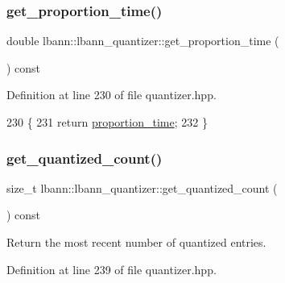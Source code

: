 \subsubsection{\texorpdfstring{get\+\_\+proportion\+\_\+time()}{get\_proportion\_time()}}
{\footnotesize\ttfamily double lbann\+::lbann\+\_\+quantizer\+::get\+\_\+proportion\+\_\+time (\begin{DoxyParamCaption}{ }\end{DoxyParamCaption}) const\hspace{0.3cm}{\ttfamily [inline]}}



Definition at line 230 of file quantizer.\+hpp.


\begin{DoxyCode}
230                                      \{
231     \textcolor{keywordflow}{return} \hyperlink{classlbann_1_1lbann__quantizer_a6bd266728f578df0c86fc2e493742cc1}{proportion\_time};
232   \}
\end{DoxyCode}
\mbox{\label{classlbann_1_1lbann__quantizer_afe560823e51a64b1bb42c6f6cbd83ee0}} 
\subsubsection{\texorpdfstring{get\+\_\+quantized\+\_\+count()}{get\_quantized\_count()}}
{\footnotesize\ttfamily size\+\_\+t lbann\+::lbann\+\_\+quantizer\+::get\+\_\+quantized\+\_\+count (\begin{DoxyParamCaption}{ }\end{DoxyParamCaption}) const\hspace{0.3cm}{\ttfamily [inline]}}

Return the most recent number of quantized entries. 

Definition at line 239 of file quantizer.\+hpp.


